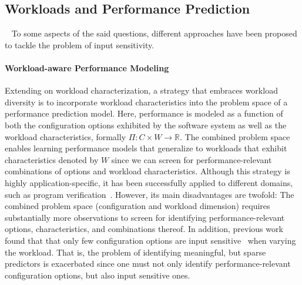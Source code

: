 	
\subsection{Workloads and Performance Prediction} ~\label{sec:strategies}
To some aspects of the said questions, different approaches have been proposed to tackle the problem of input sensitivity.

\paragraph{Workload-aware Performance Modeling}\label{sec:workload-aware}
Extending on workload characterization, a strategy that embraces workload diversity is to incorporate workload characteristics into the problem space of a performance prediction model. Here, performance is modeled as a function of both the configuration options exhibited by the software system as well as the workload characteristics, formally $\Pi: C \times W \rightarrow \mathbb{R}$.
The combined problem space enables learning performance models that generalize to workloads that exhibit characteristics denoted by $W$ since we can screen for performance-relevant combinations of options and workload characteristics. Although this strategy is highly application-specific, it has been successfully applied to different domains, such as program verification~\cite{koc_satune_2021}. However, its main disadvantages are twofold: The combined problem space (configuration and workload dimension) requires substantially more observations to screen for identifying performance-relevant options, characteristics, and combinations thereof. In addition, previous work  found that that only few configuration options are input sensitive~\cite{jamishidi_transfer_2017} when varying the workload. That is, the problem of identifying meaningful, but sparse predictors is exacerbated since one must not only identify performance-relevant configuration options, but also input sensitive ones.

